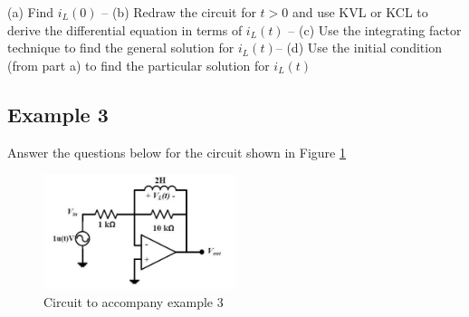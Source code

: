 \documentclass{handout}
\theoremstyle{definition}
\begin{document}
(a) Find $i_L(0)$ --
(b) Redraw the circuit for $t>0$ and use KVL or KCL to derive the differential equation in terms of $i_L(t)$ --
(c) Use the integrating factor technique to find the general solution for $i_L(t)$--
(d) Use the initial condition (from part a) to find the particular solution for  $i_L(t)$


\newpage
\clearpage
\pagebreak

\subsection{Example 3}
Answer the questions below for the circuit shown in Figure \ref{fig: Example3}
\begin{figure} [h!]
\centering
\includegraphics[width=0.5\textwidth]{Example3.jpg}
\caption{Circuit to accompany example 3}
\label{fig: Example3}
\end{figure}
\end{document}
